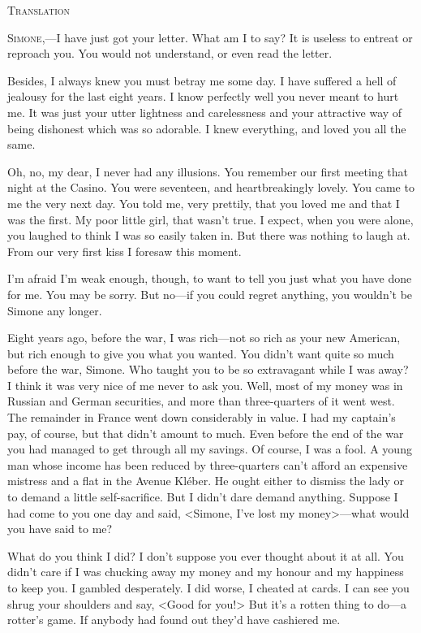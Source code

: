 \begin{center}\Large
\textsc{Translation}
\end{center}

\textsc{Simone},—I have just got your letter. What am I to say? It is useless to entreat or reproach you. You would not understand, or even read the letter.

Besides, I always knew you must betray me some day. I have suffered a hell of jealousy for the last eight years. I know perfectly well you never meant to hurt me. It was just your utter lightness and carelessness and your attractive way of being dishonest which was so adorable. I knew everything, and loved you all the same.

Oh, no, my dear, I never had any illusions. You remember our first meeting that night at the Casino. You were seventeen, and heartbreakingly lovely. You came to me the very next day. You told me, very prettily, that you loved me and that I was the first. My poor little girl, that wasn't true. I expect, when you were alone, you laughed to think I was so easily taken in. But there was nothing to laugh at. From our very first kiss I foresaw this moment.

I'm afraid I'm weak enough, though, to want to tell you just what you have done for me. You may be sorry. But no—if you could regret anything, you wouldn't be Simone any longer.

Eight years ago, before the war, I was rich—not so rich as your new American, but rich enough to give you what you wanted. You didn't want quite so much before the war, Simone. Who taught you to be so extravagant while I was away? I think it was very nice of me never to ask you. Well, most of my money was in Russian and German securities, and more than three-quarters of it went west. The remainder in France went down considerably in value. I had my captain's pay, of course, but that didn't amount to much. Even before the end of the war you had managed to get through all my savings. Of course, I was a fool. A young man whose income has been reduced by three-quarters can't afford an expensive mistress and a flat in the Avenue Kléber. He ought either to dismiss the lady or to demand a little self-sacrifice. But I didn't dare demand anything. Suppose I had come to you one day and said, <Simone, I've lost my money>—what would you have said to me?

What do you think I did? I don't suppose you ever thought about it at all. You didn't care if I was chucking away my money and my honour and my happiness to keep you. I gambled desperately. I did worse, I cheated at cards. I can see you shrug your shoulders and say, <Good for you!> But it's a rotten thing to do—a rotter's game. If anybody had found out they'd have cashiered me.


